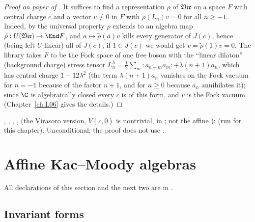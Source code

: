 \begin{proof}[Proof on paper of ]
It suffices to find a representation $\rho$ of $\mathfrak{Vir}$ on a space $F$ with central charge $c$
and a vector $v\ne0$ in $F$ with $\rho(L_n)v = 0$ for all $n\ge-1$. Indeed, by the universal property
$\rho$ extends to an algebra map $\tilde\rho : U(\ltwoVir)\to\End F$, and $a\mapsto\tilde\rho(a)v$
kills every generator of $J(c)$, hence (being left $U$-linear) all of $J(c)$; if $1\in J(c)$ we
would get $v = \tilde\rho(1)v = 0$. The library takes $F$ to be the Fock space of one free boson
with the ``linear dilaton'' (background charge) stress tensor
$L^\lambda_n = \frac12\sum_m{:}a_{n-m}a_m{:} + \lambda(n+1)a_n$, which has central charge
$1-12\lambda^2$ (the term $\lambda(n+1)a_n$ vanishes on the Fock vacuum for $n=-1$ because of the factor
$n+1$, and for $n\ge0$ because $a_n$ annihilates it); since $\C$ is algebraically closed every $c$ is of this
form, and $v$ is the Fock vacuum. (Chapter~\ref{ch:L06} gives the details.)
\end{proof}

\begin{status}
\allowbreak{}\allowbreak{}\allowbreak{}\allowbreak{}, \allowbreak{}\allowbreak{}\allowbreak{}\allowbreak{},
\allowbreak{}\allowbreak{}\allowbreak{}, \allowbreak{}, \allowbreak{}\allowbreak{} (the Virasoro version, $V(c,0)$ is nontrivial,
in ; not the affine ):
 (run for this chapter). Unconditional; the
proof does not use .
\end{status}

\section{Affine Kac--Moody algebras}\label{l02:sec:affine}

All declarations of this section and the next two are in
.

\subsection{Invariant forms}

